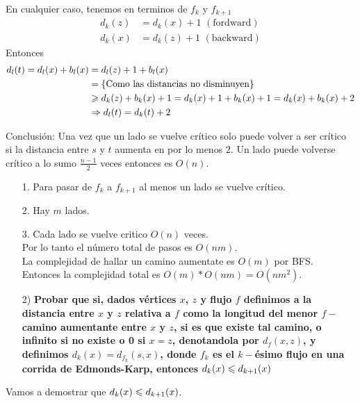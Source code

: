 \documentclass[12pt,a4paper]{article}
\begin{document}
En cualquier caso, tenemos en terminos de $f_{k}$ y $f_{k+1}$
\begin{align*}
    d_{k}(z) &= d_{k}(x) +1 \,\,(\text{fordward})\\
    d_{k}(x) &= d_{k}(z) +1 \,\,(\text{backward})
\end{align*}
Entonces
\begin{align*}
    d_{l}(t) = d_{l}(x) + b_{l}(x) &= d_{l}(z) + 1 + b_{l}(x)\\
    &=\left\lbrace \text{Como las distancias no disminuyen} \right\rbrace\\
    &\geqslant d_{k}(z) + b_{k}(x) + 1 = d_{k}(x) + 1 + b_{k}(x) +1 = d_{k}(x) + b_{k}(x)+2\\
    &\Rightarrow d_{l}(t) = d_{k}(t) +2
\end{align*}

Conclusión: Una vez que un lado se vuelve crítico solo puede volver a ser crítico 
si la distancia entre $s$ y $t$ aumenta en por lo menos $2$. Un lado puede 
volverse crítico a lo sumo $\frac{n-1}{2}$ veces entonces es $O(n)$.
\medskip

\begin{itemize}
    \item [1.] Para pasar de $f_{k}$ a $f_{k+1}$ al menos un lado se vuelve crítico.
    \item [2.] Hay $m$ lados.
    \item [3.] Cada lado se vuelve critico $O(n)$ veces.\\
        Por lo tanto el número total de pasos es $O(nm)$.\\
        La complejidad de hallar un camino aumentate es $O(m)$ por BFS.\\
        Entonces la complejidad total es $O(m)*O(nm)=O(nm^{2})$.
\end{itemize}

\begin{itemize}
    \item [2)] \textbf{Probar que si, dados vértices $x$, $z$ y flujo $f$ definimos 
    a la distancia entre $x$ y $z$ relativa a $f$ como la longitud del menor 
    $f-$camino aumentante entre $x$ y $z$, si es que existe tal camino, o infinito 
    si no existe o 0 si $x = z$, denotandola por $d_{f} (x, z)$, y definimos 
    $d_{k}(x) = d_{f_{k}} (s, x)$, donde $f_{k}$ es el $k-$ésimo flujo en una 
    corrida de Edmonds-Karp, entonces $d_{k}(x) \leqslant d_{k+1}(x)$}
    \label{dem:dist}
\end{itemize}

Vamos a demostrar que $d_{k}(x) \leqslant d_{k+1}(x)$.
\medskip
\end{document}
